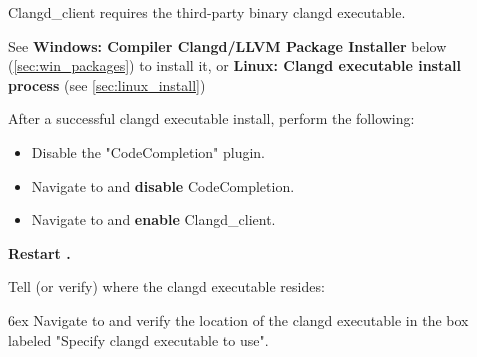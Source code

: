 Clangd\_client requires the third-party binary clangd executable.

See \textbf{Windows: Compiler Clangd/LLVM Package Installer} below (\ref{sec:win_packages}) to install it, or \textbf{Linux: Clangd executable install process} (see \ref{sec:linux_install})

After a successful clangd executable install, perform the following:

\begin{itemize}[noitemsep]
\item Disable the "CodeCompletion" plugin.
\item Navigate to  and \textbf{disable} CodeCompletion.
\item Navigate to  and \textbf{enable} Clangd\_client.
\end{itemize}
\textbf{Restart \codeblocks.}

Tell (or verify) \codeblocks where the clangd executable resides:\par
\begingroup
\leftskip 6ex
Navigate to  and verify the location of the clangd executable in the box labeled "Specify clangd executable to use".
\par
\endgroup

